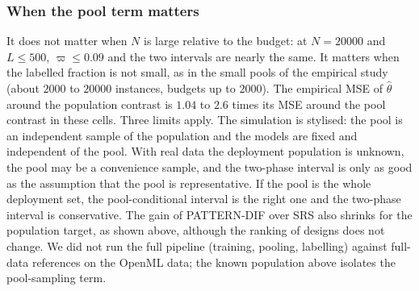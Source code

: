\subsubsection*{When the pool term matters}
It does not matter when $N$ is large relative to the budget: at $N=20000$ and $L\le500$, $\varpi\le0.09$ and the two intervals are nearly the same. It matters when the labelled fraction is not small, as in the small pools of the empirical study (about $2000$ to $20000$ instances, budgets up to $2000$). The empirical MSE of $\hat\theta$ around the population contrast is $1.04$ to $2.6$ times its MSE around the pool contrast in these cells. Three limits apply. The simulation is stylised: the pool is an independent sample of the population and the models are fixed and independent of the pool. With real data the deployment population is unknown, the pool may be a convenience sample, and the two-phase interval is only as good as the assumption that the pool is representative. If the pool is the whole deployment set, the pool-conditional interval is the right one and the two-phase interval is conservative. The gain of PATTERN-DIF over SRS also shrinks for the population target, as shown above, although the ranking of designs does not change. We did not run the full pipeline (training, pooling, labelling) against full-data references on the OpenML data; the known population above isolates the pool-sampling term.
